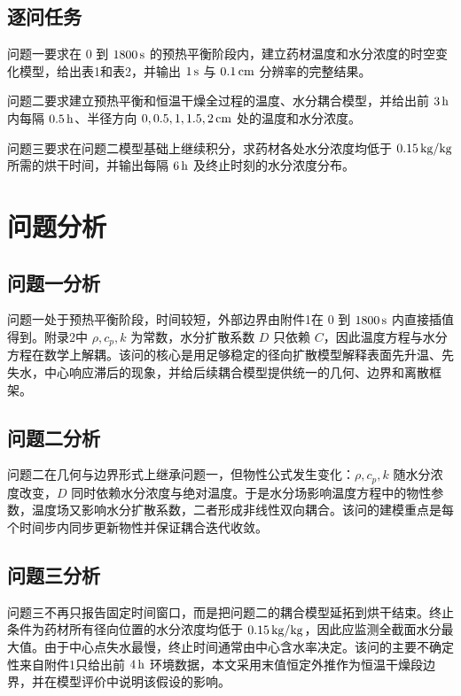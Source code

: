 \documentclass[UTF8,a4paper,12pt]{ctexart}
\numberwithin{equation}{section}
\begin{document}
\subsection{逐问任务}
问题一要求在 $0$ 到 $1800\rm\,s$ 的预热平衡阶段内，建立药材温度和水分浓度的时空变化模型，给出表1和表2，并输出 $1\rm\,s$ 与 $0.1\rm\,cm$ 分辨率的完整结果。

问题二要求建立预热平衡和恒温干燥全过程的温度、水分耦合模型，并给出前 $3\rm\,h$ 内每隔 $0.5\rm\,h$、半径方向 $0,0.5,1,1.5,2\rm\,cm$ 处的温度和水分浓度。

问题三要求在问题二模型基础上继续积分，求药材各处水分浓度均低于 $0.15\rm\,kg/kg$ 所需的烘干时间，并输出每隔 $6\rm\,h$ 及终止时刻的水分浓度分布。

\section{问题分析}
\subsection{问题一分析}
问题一处于预热平衡阶段，时间较短，外部边界由附件1在 $0$ 到 $1800\rm\,s$ 内直接插值得到。附录2中 $\rho,c_p,k$ 为常数，水分扩散系数 $D$ 只依赖 $C$，因此温度方程与水分方程在数学上解耦。该问的核心是用足够稳定的径向扩散模型解释表面先升温、先失水，中心响应滞后的现象，并给后续耦合模型提供统一的几何、边界和离散框架。

\subsection{问题二分析}
问题二在几何与边界形式上继承问题一，但物性公式发生变化：$\rho,c_p,k$ 随水分浓度改变，$D$ 同时依赖水分浓度与绝对温度。于是水分场影响温度方程中的物性参数，温度场又影响水分扩散系数，二者形成非线性双向耦合。该问的建模重点是每个时间步内同步更新物性并保证耦合迭代收敛。

\subsection{问题三分析}
问题三不再只报告固定时间窗口，而是把问题二的耦合模型延拓到烘干结束。终止条件为药材所有径向位置的水分浓度均低于 $0.15\rm\,kg/kg$，因此应监测全截面水分最大值。由于中心点失水最慢，终止时间通常由中心含水率决定。该问的主要不确定性来自附件1只给出前 $4\rm\,h$ 环境数据，本文采用末值恒定外推作为恒温干燥段边界，并在模型评价中说明该假设的影响。
\end{document}
